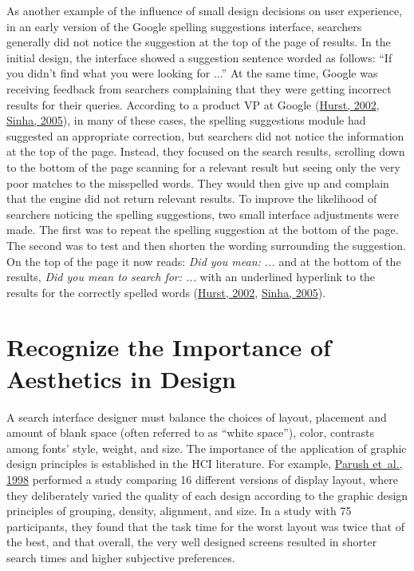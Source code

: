 \documentclass[sigconf,nonacm,screen,pbalance]{acmart}
\begin{document}
As another example of the influence of small design decisions on user experience, in an early version of
the Google spelling suggestions interface, searchers generally did not notice the suggestion at the top of
the page of results. In the initial design, the interface showed a suggestion sentence worded as follows:
``If you didn't find what you were looking for ...'' At the same time, Google was receiving feedback from
searchers complaining that they were getting incorrect results for their queries. According to a product
VP at Google (\href{https://searchuserinterfaces.com/book/sui_references.html#hurst02}{Hurst, 2002}, \href{https://searchuserinterfaces.com/book/sui_references.html#sinha05}{ Sinha, 2005}),
in many of these cases, the spelling suggestions module had suggested an appropriate correction, but
searchers did not notice the information at the top of the page. Instead, they focused on the search
results, scrolling down to the bottom of the page scanning for a relevant result but seeing only the very
poor matches to the misspelled words. They would then give up and complain that the engine did not return
relevant results. To improve the likelihood of searchers noticing the spelling suggestions, two small
interface adjustments were made. The first was to repeat the spelling suggestion at the bottom of the
page. The second was to test and then shorten the wording surrounding the suggestion. On the top of the
page it now reads: {\em  Did you mean: ...} and at the bottom of the results, {\em  Did you mean to search
for: ...} with an underlined hyperlink to the results for the correctly spelled words (\href{https://searchuserinterfaces.com/book/sui_references.html#hurst02}{Hurst, 2002}, \href{https://searchuserinterfaces.com/book/sui_references.html#sinha05}{ Sinha, 2005}).

\section{Recognize the Importance of Aesthetics in Design}

A search interface designer must balance the choices of layout, placement and amount of blank space (often
referred to as ``white space''), color, contrasts among fonts' style, weight, and size. The importance of
the application of graphic design principles is established in the HCI literature. For example, \href{https://searchuserinterfaces.com/book/sui_references.html#parush10elg}{Parush et~al., 1998} performed a study comparing 16 different versions of display layout, where they
deliberately varied the quality of each design according to the graphic design principles of grouping,
density, alignment, and size. In a study with 75 participants, they found that the task time for the worst
layout was twice that of the best, and that overall, the very well designed screens resulted in shorter
search times and higher subjective preferences.
\end{document}
